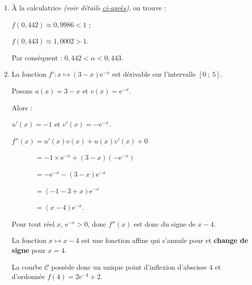 \begin{corrige}
\begin{enumerate}
          Sur l'intervalle $[0~;~3]$, $f$ est \textbf{continue} et \textbf{strictement croissante}. 1 appartient à l'intervalle $[0~;\text{e}^{-3}+2 ]$ donc l'équation $f(x)=1$ admet une unique solution sur l'intervalle $[0~;~3]$.
          \par
          Sur l'intervalle $[3~;~5]$, le minimum de $f$ est supérieur à 2 donc l'équation ${f(x)=1}$ n'a pas de solution sur cet intervalle.
          \par
          Par conséquent, l'équation $f(x)=1$ admet une unique solution sur l'intervalle $[0~;~5]$.
          \item %
          \`A la calculatrice \textit{(voir détails  \hyperlink{tvi-pap}{ci-après})}, on trouve :
          \par
          $f(0,442) \approx 0,9986 < 1$ ;
          \par
          $f(0,443) \approx 1,0002 > 1$.
          \par
          Par conséquent : $0,442 < \alpha < 0,443$.
          \par
          \item %
          La fonction $f' : x \longmapsto (3-x)\text{e}^{-x}$ est dérivable sur l'intervalle $[0~;~5]$.
          \par
          Posons $u(x)=3-x$ et $v(x)=\text{e}^{-x}$.
          \par
          Alors :
          \par
          $u'(x)=-1$ et $v'(x)=-\text{e}^{-x}$.
          \par
          $f''(x)=u'(x)v(x)+u(x)v'(x) + 0$
          \par
          $\phantom{f''(x)}= -1 \times \text{e}^{-x}+(3-x)(-\text{e}^{-x})$
          \par
          $\phantom{f''(x)}= -\text{e}^{-x}-(3-x)\text{e}^{-x}$
          \par
          $\phantom{f''(x)}=(-1-3+x)\text{e}^{-x}$
          \par
          $\phantom{f''(x)}=(x-4)\text{e}^{-x}$.
          \par
          Pour tout réel $x$, ${\text{e}^{-x} > 0}$, donc $f''(x)$ est donc du signe de $x-4$.
          \par
          La fonction $x \longmapsto x-4$ est une fonction affine qui s'annule pour et \textbf{change de signe} pour $x=4$.
          \par
          La courbe $\mathscr{C}$ possède donc un unique point d'inflexion d'abscisse $4$ et d'ordonnée $f(4)=2 \text{e}^{-4}+2$.
          \par
     \end{enumerate}
\end{corrige}
